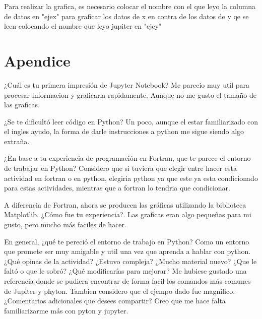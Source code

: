 \documentclass[11pt]{article}
\begin{document}
Para realizar la grafica, es necesario colocar el nombre con el que leyo la columna de datos en "ejex" para graficar los datos de x en contra de los datos de y qe se leen colocando el nombre que leyo jupiter en "ejey" 

\section{Apendice}


    ¿Cuál es tu primera impresión de Jupyter Notebook?
    \linebreak
    Me parecio muy util para procesar informacion y graficarla rapidamente. Aunque no me gusto el tamaño de las graficas.
    \linebreak
    
    ¿Se te dificultó leer código en Python?
    \linebreak
    Un poco, aunque el estar familiarizado con el ingles ayudo, la forma de darle instrucciones a python me sigue siendo algo extraña.
    
    ¿En base a tu experiencia de programación en Fortran, que te parece el entorno de trabajar en Python?
    \linebreak
    Considero que si tuviera que elegir entre hacer esta actividad en fortran o en python, elegiria python ya que este ya esta condicionado para estas actividades, mientras que a fortran lo tendria que condicionar.
    \linebreak
    
    A diferencia de Fortran, ahora se producen las gráficas utilizando la biblioteca Matplotlib. ¿Cómo fue tu experiencia?. 
    \linebreak
    Las graficas eran algo pequeñas para mi gusto, pero mucho más faciles de hacer.
    \linebreak
    
    En general, ¿qué te pereció el entorno de trabajo en Python? 
    \linebreak
    Como un entorno que promete ser muy amigable y util una vez que aprenda a hablar con python.
    \linebreak
    ¿Qué opinas de la actividad? ¿Estuvo compleja? ¿Mucho material nuevo? ¿Que le faltó o que le sobró? ¿Qué modificarías para mejorar? 
    \linebreak
    Me hubiese gustado una referencia donde se pudiera encontrar de forma facil los comandos más comunes de Jupiter y phyton. Tambien considero que el ejempo dado fue magnifico.
    ¿Comentarios adicionales que desees compartir? 
    Creo que me hace falta familiarizarme más con pyton y jupyter.

    
    
\end{document}
